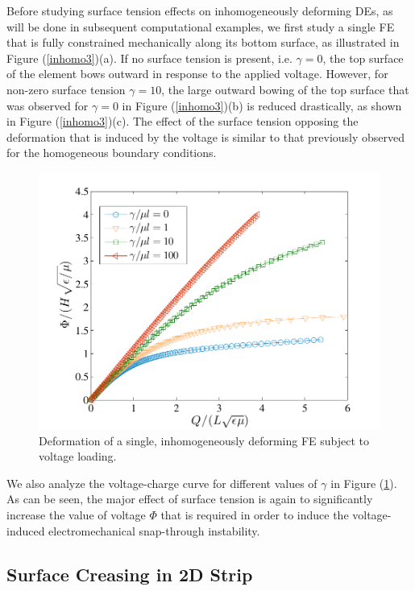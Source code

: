 \documentclass[final,authoryear,3p,times,twocolumn]{elsarticle}
\begin{document}
Before studying surface tension effects on inhomogeneously deforming DEs, as will be done in subsequent computational examples, we first study a single FE that is fully constrained mechanically along its bottom surface, as illustrated in Figure (\ref{inhomo3})(a).  If no surface tension is present, i.e. $\gamma=0$, the top surface of the element bows outward in response to the applied voltage.  However, for non-zero surface tension $\gamma=10$, the large outward bowing of the top surface that was observed for $\gamma=0$ in Figure (\ref{inhomo3})(b) is reduced drastically, as shown in Figure (\ref{inhomo3})(c).  The effect of the surface tension opposing the deformation that is induced by the voltage is similar to that previously observed for the homogeneous boundary conditions.

\begin{figure} \centering 
\includegraphics[scale=0.7]{pics/voltage_inhom.pdf}
\caption{Deformation of a single, inhomogeneously deforming FE subject to voltage loading.}
\label{inhomo}  \end{figure}

We also analyze the voltage-charge curve for different values of $\gamma$ in Figure (\ref{inhomo}).  As can be seen, the major effect of surface tension is again to significantly increase the value of voltage $\Phi$ that is required in order to induce the voltage-induced electromechanical snap-through instability.

\subsection{Surface Creasing in 2D Strip}
\end{document}

